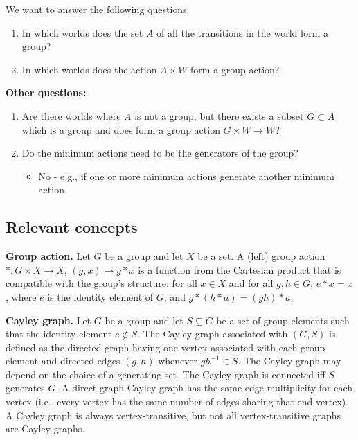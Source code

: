 We want to answer the following questions:
\begin{enumerate}
    \item In which worlds does the set $A$ of all the transitions in the world form a group?
    
    \item In which worlds does the action $A \times W$ form a group action?
\end{enumerate}

\textbf{Other questions:}
\begin{enumerate}
    \item Are there worlds where $A$ is not a group, but there exists a subset $G \subset A$ which is a group and does form a group action $G \times W \to W$?
    
    \item Do the minimum actions need to be the generators of the group?
    \begin{itemize}
        \item No - e.g., if one or more minimum actions generate another minimum action.
    \end{itemize}
\end{enumerate}

\subsection{Relevant concepts}

\textbf{Group action.}
Let $G$ be a group and let $X$ be a set.
A (left) group action $*: G \times X \to X$, $(g,x) \mapsto g * x$ is a function from the Cartesian product that is compatible with the group's structure: for all $x \in X$ and for all $g,h \in G$, $e * x = x$, where $e$ is the identity element of $G$, and $g * (h * a) = (g h) * a$.

\textbf{Cayley graph.}
Let $G$ be a group and let $S \subseteq G$ be a set of group elements such that the identity element $e \not\in S$.
The Cayley graph associated with $(G, S)$ is defined as the directed graph having one vertex associated with each group element and directed edges $(g,h)$ whenever $g h^{-1} \in S$.
The Cayley graph may depend on the choice of a generating set.
The Cayley graph is connected iff $S$ generates $G$.
A direct graph Cayley graph has the same edge multiplicity for each vertex (i.e., every vertex has the same number of edges sharing that end vertex).
A Cayley graph is always vertex-transitive, but not all vertex-transitive graphs are Cayley graphs.

